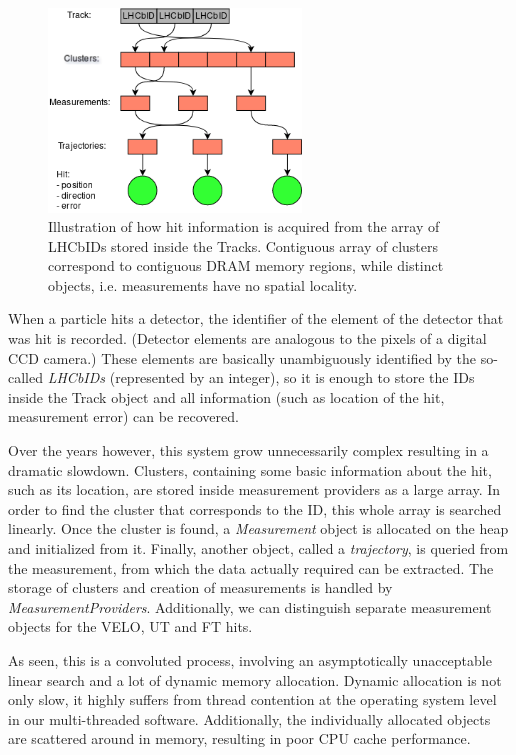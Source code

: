 \documentclass[12pt]{article}
\begin{document}
\begin{figure}[H]
	\begin{center}
		\includegraphics[width=0.6\textwidth]{kalmanfit_loadhits_schematic}
	\end{center}
	\caption{Illustration of how hit information is acquired from the array of LHCbIDs stored inside the Tracks. Contiguous array of clusters correspond to contiguous DRAM memory regions, while distinct objects, i.e. measurements have no spatial locality.}
	\label{fig_kalmanfit_loadhits_schematic}
\end{figure}

When a particle hits a detector, the identifier of the element of the detector that was hit is recorded. (Detector elements are analogous to the pixels of a digital CCD camera.) These elements are basically unambiguously identified by the so-called \textit{LHCbIDs} (represented by an integer), so it is enough to store the IDs inside the Track object and all information (such as location of the hit, measurement error) can be recovered. 

Over the years however, this system grow unnecessarily complex resulting in a dramatic slowdown. Clusters, containing some basic information about the hit, such as its location, are stored inside measurement providers as a large array. In order to find the cluster that corresponds to the ID, this whole array is searched linearly. Once the cluster is found, a \textit{Measurement} object is allocated on the heap and initialized from it. Finally, another object, called a \textit{trajectory}, is queried from the measurement, from which the data actually required can be extracted. The storage of clusters and creation of measurements is handled by \textit{MeasurementProviders}. Additionally, we can distinguish separate measurement objects for the VELO, UT and FT hits.

As seen, this is a convoluted process, involving an asymptotically unacceptable linear search and a lot of dynamic memory allocation. Dynamic allocation is not only slow, it highly suffers from thread contention at the operating system level in our multi-threaded software. Additionally, the individually allocated objects are scattered around in memory, resulting in poor CPU cache performance.
\end{document}
